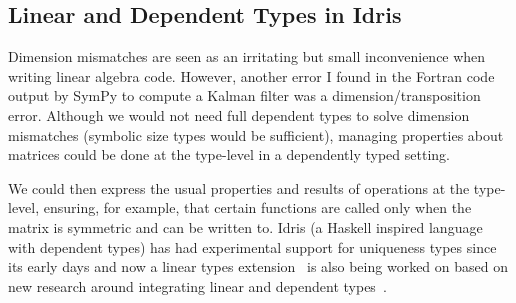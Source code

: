 \subsection{Linear and Dependent Types in Idris}\label{subsec:lin_dep_types}

Dimension mismatches are seen as an irritating but small inconvenience when
writing linear algebra code. However, another error I found in the Fortran code
output by SymPy to compute a Kalman filter was a dimension/transposition error.
Although we would not need full dependent types to solve dimension mismatches
(symbolic size types would be sufficient), managing properties about matrices
could be done at the type-level in a dependently typed setting.

We could then express the usual properties and results of operations at the
type-level, ensuring, for example, that certain functions are called only when
the matrix is symmetric and can be written to. Idris (a Haskell inspired
language with dependent types) has had experimental support for uniqueness
types since its early days and now a linear types extension~\cite{idris_linear}
is also being worked on based on new research around integrating linear and
dependent types~\cite{atkey}.
